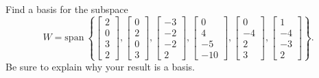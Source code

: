 \documentclass{article}
\begin{document}
\begin{exerciseStatement}
    Find a basis for the subspace
\[W=\mathrm{span}\ \left\{\left[\begin{array}{r}
2 \\
0 \\
3 \\
2
\end{array}\right] , \left[\begin{array}{r}
0 \\
2 \\
0 \\
3
\end{array}\right] , \left[\begin{array}{r}
-3 \\
-2 \\
-2 \\
2
\end{array}\right] , \left[\begin{array}{r}
0 \\
4 \\
-5 \\
-10
\end{array}\right] , \left[\begin{array}{r}
0 \\
-4 \\
2 \\
3
\end{array}\right] , \left[\begin{array}{r}
1 \\
-4 \\
-3 \\
2
\end{array}\right]\right\}.\]
 Be sure to explain why your result is a basis.


  
\end{exerciseStatement}
\end{document}
